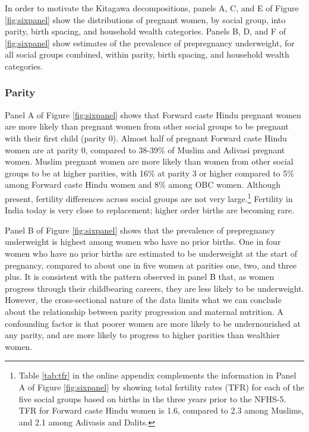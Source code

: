 \documentclass[12pt]{article}
\begin{document}
In order to motivate the Kitagawa decompositions, panels A, C, and E of Figure \ref{fig:sixpanel} show the distributions of pregnant women, by social group, into parity, birth spacing, and household wealth categories.  Panels B, D, and F of \ref{fig:sixpanel} show estimates of the prevalence of prepregnancy underweight, for all social groups combined, within parity, birth spacing, and household wealth categories.  

\subsubsection*{Parity}

Panel A of Figure \ref{fig:sixpanel} shows that Forward caste Hindu pregnant women are more likely than pregnant women from other social groups to be pregnant with their first child (parity 0). Almost half of pregnant Forward caste Hindu women are at parity 0, compared to 38-39\% of Muslim and Adivasi pregnant women. Muslim pregnant women are more likely than women from other social groups to be at higher parities, with 16\% at parity 3 or higher compared to 5\% among Forward caste Hindu women and 8\% among OBC women. Although present, fertility differences across social groups are not very large.\footnote{Table \ref{tab:tfr} in the online appendix complements the information in Panel A of Figure \ref{fig:sixpanel} by showing total fertility rates (TFR) for each of the five social groups based on births in the three years prior to the NFHS-5.  TFR for Forward caste Hindu women is 1.6, compared to 2.3 among Muslims, and 2.1 among Adivasis and Dalits.}  Fertility in India today is very close to replacement; higher order births are becoming rare.

Panel B of Figure \ref{fig:sixpanel} shows that the prevalence of prepregnancy underweight is highest among women who have no prior births.  One in four women who have no prior births are estimated to be underweight at the start of pregnancy, compared to about one in five women at parities one, two, and three plus.  It is consistent with the pattern observed in panel B that, as women progress through their childbearing careers, they are less likely to be underweight.  However, the cross-sectional nature of the data limits what we can conclude about the relationship between parity progression and maternal nutrition.  A confounding factor is that poorer women are more likely to be undernourished at any parity, and are more likely to progress to higher parities than wealthier women.  
\end{document}

